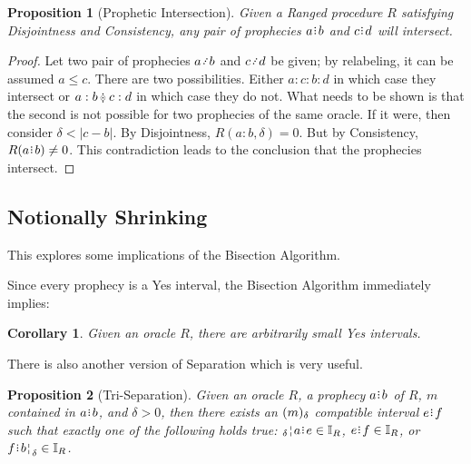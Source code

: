 \documentclass[12pt]{article}
\newtheorem{corollary}{Corollary}[section]
\newtheorem{proposition}{Proposition}[section]
\begin{document}
\begin{proposition}[Prophetic Intersection]\label{os-prointer}
     Given a Ranged procedure $R$ satisfying Disjointness and Consistency, any pair of prophecies $a\rint b$ and $c\rint d$ will intersect. 
\end{proposition}

\begin{proof}
    Let two pair of prophecies $a \lte b$ and $c \lte d$ be given; by relabeling, it can be assumed $a \leq c$. There are two possibilities. Either $a : c : b: d$ in which case they intersect or $a:b\betneq c: d$ in which case they do not. What needs to be shown is that the second is not possible for two prophecies of the same oracle. If it were, then consider $\delta < |c-b|$. By Disjointness, $R(a:b, \delta) = 0$. But by Consistency,  $R(a\rint b) \neq 0$. This contradiction leads to the conclusion that the prophecies intersect. 
\end{proof}


\subsection{Notionally Shrinking}


This explores some implications of the Bisection Algorithm. 

Since every prophecy is a Yes interval, the Bisection Algorithm immediately implies: 
\begin{corollary}
    Given an oracle $R$, there are arbitrarily small Yes intervals. 
\end{corollary}

There is also another version of Separation which is very useful. 

\begin{proposition}[Tri-Separation]
    Given an oracle $R$, a prophecy $a\rint b$ of $R$, $m$ contained in $a\rint b$, and $\delta > 0$, then there exists an $(m)_{\delta}$ compatible interval $e\rint f$ such that exactly one of the following holds true:   $\fuzbleft{a}\rint e \in \mathbb{I}_R$, $e\rint f \in \mathbb{I}_R$,  or $f\rint \fuzbright{b} \in \mathbb{I}_R$.
\end{proposition}
\end{document}
